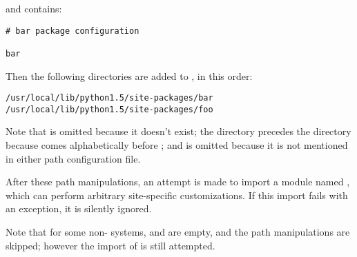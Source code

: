 and  contains:

\begin{verbatim}
# bar package configuration

bar
\end{verbatim}

Then the following directories are added to , in this
order:

\begin{verbatim}
/usr/local/lib/python1.5/site-packages/bar
/usr/local/lib/python1.5/site-packages/foo
\end{verbatim}

Note that  is omitted because it doesn't exist; the
 directory precedes the  directory because
 comes alphabetically before ; and
 is omitted because it is not mentioned in either path
configuration file.

After these path manipulations, an attempt is made to import a module
named , which can
perform arbitrary site-specific customizations.  If this import fails
with an  exception, it is silently ignored.

Note that for some non-\UNIX{} systems,  and
 are empty, and the path manipulations are
skipped; however the import of
 is still attempted.
